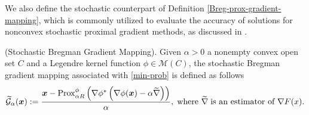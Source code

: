 \documentclass[twoside,11pt]{article}
\newcommand{\cM}{\mathcal M}
\def\vx{{\bm{x}}}
\begin{document}
 We also define the stochastic counterpart of Definition \ref{Breg-prox-gradient-mapping}, which is commonly utilized to evaluate the accuracy of solutions for nonconvex stochastic proximal gradient methods, as discussed in \cite{ghadimi2016mini}.
\begin{definition}\label{stoc-Bregman-grad-map}
(Stochastic Bregman Gradient Mapping).
Given $\alpha>0$ a nonempty convex open set $C$ and a Legendre kernel function $\phi\in\cM(C)$, the stochastic Bregman gradient mapping associated with \eqref{min-prob} is defined as follows
 \[
 \widetilde{\mathcal G}_{\alpha}({\vx}):=\frac{{\vx}-{\rm Prox}^\phi_{\alpha R}\left(\nabla\phi^*\left(\nabla\phi({\vx})-\alpha\widetilde\nabla\right)\right)}{\alpha},\;\text{where }\widetilde{\nabla}\;\text{is an estimator of }\nabla F(x).
 \]   
\end{definition}
\end{document}
